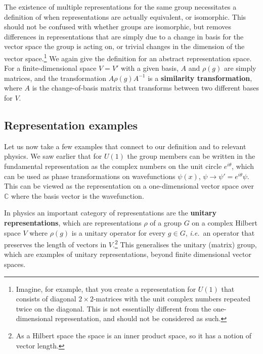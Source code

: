 \documentclass[notes.tex]{subfiles}
\begin{document}
The existence of multiple representations for the same group necessitates a definition of when representations are actually equivalent, or isomorphic. This should not be confused with whether groups are isomorphic, but removes differences in representations that are simply due to a change in basis for the vector space the group is acting on, or trivial changes in the dimension of the vector space.\footnote{Imagine, for example, that you create a representation for $U(1)$ that consists of diagonal $2\times2$-matrices with the unit complex numbers repeated twice on the diagonal. This is not essentially different from the one-dimensional representation, and should not be considered as such.} We again give the definition for an abstract representation space.  
For a finite-dimensional space $V=V'$ with a given basis, $A$ and $\rho(g)$ are simply matrices, and the transformation $A\rho(g)A^{-1} $ is a {\bf similarity transformation}, where $A$ is the change-of-basis matrix that transforms between two different bases for $V$.


\subsection{Representation examples}

Let us now take a few examples that connect to our definition and to relevant physics. We saw earlier that for $U(1)$ the group members can be written in the fundamental representation as the complex numbers on the unit circle $e^{i \theta}$, which can be used as phase transformations on wavefunctions $\psi(x)$, $\psi\to\psi'=e^{i\theta}\psi$. This can be viewed as the representation on a one-dimensional vector space over $\mathbb C$ where the basis vector is the wavefunction.

In physics an important category of representations are the {\bf unitary representations}, which are representations $\rho$ of a group $G$ on a complex Hilbert space $V$ where $\rho(g)$ is a unitary operator for every $g\in G$, {\it i.e.}\ an operator that preserves the length of vectors in $V$.\footnote{As a Hilbert space the space is an inner product space, so it has a notion of vector length.} This generalises the unitary (matrix) group, which are examples of unitary representations, beyond finite dimensional vector spaces.
\end{document}
